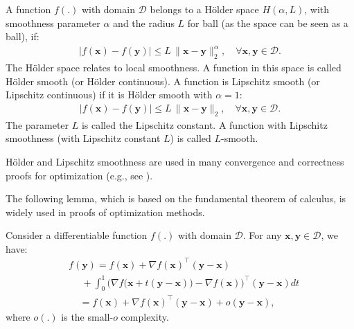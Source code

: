 \documentclass[lang=cn,10pt]{gorgeousnbook}
\numberwithin{equation}{section}%
\numberwithin{figure}{section}%
\begin{document}
\begin{definition}
A function $f(.)$ with domain $\mathcal{D}$ belongs to a H{\"o}lder space $H(\alpha, L)$, with smoothness parameter $\alpha$ and the radius $L$ for ball (as the space can be seen as a ball), if:
\begin{align}
|f(\boldsymbol{x}) - f(\boldsymbol{y})| \leq L\, \|\boldsymbol{x} - \boldsymbol{y}\|_2^{\alpha}, \quad \forall \boldsymbol{x}, \boldsymbol{y} \in \mathcal{D}.
\end{align}
The H{\"o}lder space relates to local smoothness. A function in this space is called H{\"o}lder smooth (or H{\"o}lder continuous). 
A function is Lipschitz smooth (or Lipschitz continuous) if it is H{\"o}lder smooth with $\alpha=1$:
\begin{align}
|f(\boldsymbol{x}) - f(\boldsymbol{y})| \leq L\, \|\boldsymbol{x} - \boldsymbol{y}\|_2, \quad \forall \boldsymbol{x}, \boldsymbol{y} \in \mathcal{D}.
\end{align}
The parameter $L$ is called the Lipschitz constant.
A function with Lipschitz smoothness (with Lipschitz constant $L$) is called $L$-smooth. 
\end{definition}
H{\"o}lder and Lipschitz smoothness are used in many convergence and correctness proofs for optimization (e.g., see \cite{liu2021smooth}). 

The following lemma, which is based on the fundamental theorem of calculus, is widely used in proofs of optimization methods. 
\begin{lemma}
Consider a differentiable function $f(.)$ with domain $\mathcal{D}$.
For any $\boldsymbol{x}, \boldsymbol{y} \in \mathcal{D}$, we have:
\begin{equation}\label{equation_fundamental_theorem_calculus}
\begin{aligned}
&f(\boldsymbol{y}) = f(\boldsymbol{x}) + \nabla f(\boldsymbol{x})^\top (\boldsymbol{y} - \boldsymbol{x}) \\
&~~~~~~+ \int_0^1 \Big(\nabla f\big(\boldsymbol{x} + t(\boldsymbol{y} - \boldsymbol{x})\big) - \nabla f(\boldsymbol{x}) \Big)^\top (\boldsymbol{y} - \boldsymbol{x}) dt \\
&~~~~~= f(\boldsymbol{x}) + \nabla f(\boldsymbol{x})^\top (\boldsymbol{y} - \boldsymbol{x}) + o(\boldsymbol{y} - \boldsymbol{x}),
\end{aligned}
\end{equation}
where $o(.)$ is the small-$o$ complexity.
\end{lemma}
\end{document}
